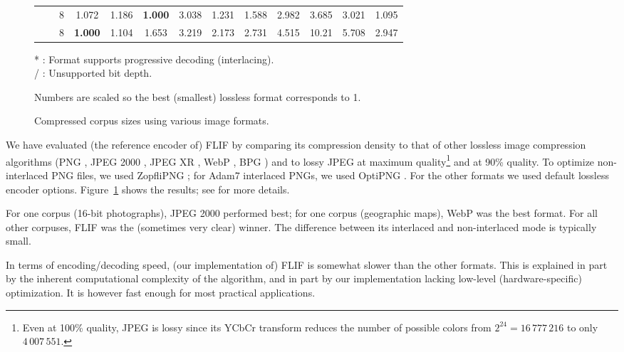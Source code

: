 \documentclass{article}
\begin{document}
\begin{figure}
\begin{center}
\begin{tabular}{lcc|c|c|c|c|c|c|c|c|c|c}
& \cite{corpus_openstreetmap} & \scriptsize 8 & 1.072 & 1.186 & \bf 1.000 & 3.038 & 1.231 & 1.588 & 2.982 & 3.685 & \scriptsize 3.021 & \scriptsize 1.095\\
& \cite{corpus_PSF}           & \scriptsize 8 & \bf 1.000 & 1.104 & 1.653 & 3.219 & 2.173 & 2.731 & 4.515 & 10.21 & \scriptsize 5.708 & \scriptsize 2.947 \\
\end{tabular}
\end{center}
* : Format supports progressive decoding (interlacing).\\
/ : Unsupported bit depth.

Numbers are scaled so the best (smallest) lossless format corresponds to 1.
\caption{Compressed corpus sizes using various image formats.}
\label{benchmarks}
\end{figure}




We have evaluated (the reference encoder of) FLIF
by comparing its compression density to that of other lossless image compression algorithms
(PNG \cite{PNG}, JPEG 2000 \cite{JPEG2000}, JPEG XR \cite{JPEGXR}, WebP \cite{WebP},
BPG \cite{BPG}) %
and to lossy JPEG \cite{JPEG} at maximum quality\footnote{
Even at 100\% quality, JPEG is lossy since its YCbCr transform reduces the number of
possible colors from $2^{24} = 16\,777\,216$ to only $4\,007\,551$.}
and at 90\% quality.
To optimize non-interlaced PNG files, we used ZopfliPNG \cite{ZopfliPNG};
for Adam7 interlaced PNGs, we used OptiPNG \cite{OptiPNG}.
For the other formats we used default lossless encoder options.
Figure~\ref{benchmarks} shows the results; see \cite{flif_benchmarks} for more details.

For one corpus (16-bit photographs), JPEG 2000 performed best; for one corpus (geographic maps), WebP was the best format.
For all other corpuses, FLIF was the (sometimes very clear) winner.
The difference between its interlaced and non-interlaced mode is typically small.

In terms of encoding/decoding speed, (our implementation of) FLIF is somewhat slower than the other formats.
This is explained in part by the inherent computational complexity of the algorithm, and in part by our implementation
lacking low-level (hardware-specific) optimization. It is however fast enough for most practical applications.
\end{document}
